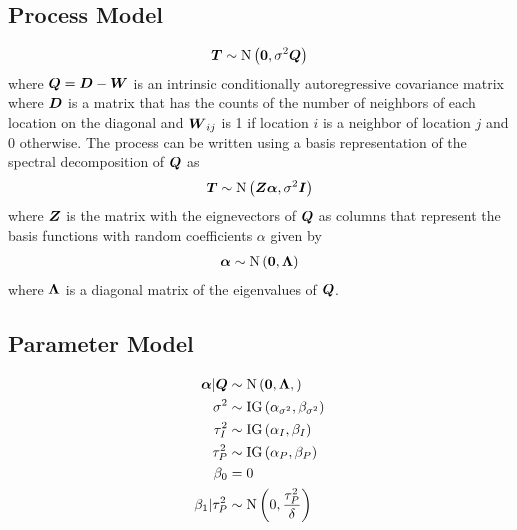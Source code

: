 \documentclass{article}\usepackage[]{graphicx}\usepackage[]{color}
\def\bm#1{\mbox{\boldmath $#1$}}
\begin{document}
\subsection{Process Model}
%
\begin{align*}
%
\bm{T} & \sim \mbox{N}\left( \bm{0}, \sigma^2 \bm{Q} \right) \\
%
%
\end{align*}
%
where $\bm{Q} = \bm{D} - \bm{W}$ is an intrinsic conditionally autoregressive covariance matrix where $\bm{D}$ is a matrix that has the counts of the number of neighbors of each location on the diagonal and $\bm{W}_{i j}$ is 1 if location $i$ is a neighbor of location $j$ and 0 otherwise. The process can be written using a basis representation of the spectral decomposition of $\bm{Q}$ as
%
\begin{align*}
%
\bm{T} & \sim \mbox{N}\left( \bm{Z} \bm{\alpha}, \sigma^2 \bm{I} \right) \\
%
\end{align*}
%
where $\bm{Z}$ is the matrix with the eignevectors of $\bm{Q}$ as columns that represent the basis functions with random coefficients $\alpha$ given by
%
\begin{align*}
%
\bm{\alpha} & \sim \mbox{N}\left( \bm{0}, \bm{\Lambda} \right) \\
%
\end{align*}
%
where $\bm{\Lambda}$ is a diagonal matrix of the eigenvalues of $\bm{Q}$.
%
%
\subsection{Parameter Model}
%
\begin{align*}
%
\bm{\alpha} | \bm{Q} & \sim \mbox{N}\left(\bm{0}, \bm{\Lambda}, \right)\\
%
\sigma^2 & \sim \mbox{IG}\left( \alpha_{\sigma^2}, \beta_{\sigma^2} \right) \\
%
\tau^2_I & \sim \mbox{IG} \left( \alpha_I, \beta_I \right) \\
%
\tau^2_P & \sim \mbox{IG} \left( \alpha_P, \beta_P \right) \\
%
\beta_0 & = 0 \\
%
\beta_1 | \tau^2_P & \sim \mbox{N} \left( 0, \frac{\tau^2_P} {\delta} \right) \\
%
\end{align*}
%
%
%
\end{document}
